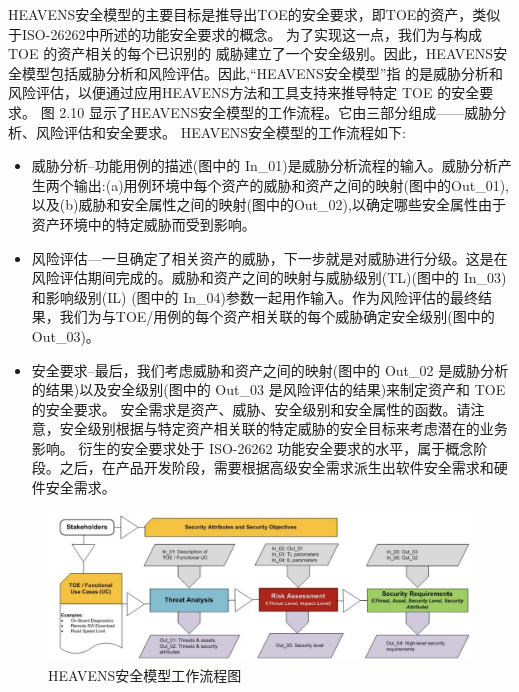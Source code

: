HEAVENS安全模型的主要目标是推导出TOE的安全要求，即TOE的资产，类似于ISO-26262中所述的功能安全要求的概念。
为了实现这一点，我们为与构成 TOE 的资产相关的每个已识别的
威胁建立了一个安全级别。因此，HEAVENS安全模型包括威胁分析和风险评估。因此,“HEAVENS安全模型”指
的是威胁分析和风险评估，以便通过应用HEAVENS方法和工具支持来推导特定 TOE 的安全要求。
图 2.10 显示了HEAVENS安全模型的工作流程。它由三部分组成——威胁分析、风险评估和安全要求。
HEAVENS安全模型的工作流程如下:
\begin{itemize}
    \item  威胁分析–功能用例的描述(图中的 In\_01)是威胁分析流程的输入。威胁分析产生两个输出:(a)用例环境中每个资产的威胁和资产之间的映射(图中的Out\_01),
    以及(b)威胁和安全属性之间的映射(图中的Out\_02),以确定哪些安全属性由于资产环境中的特定威胁而受到影响。
    \item  风险评估—一旦确定了相关资产的威胁，下一步就是对威胁进行分级。这是在风险评估期间完成的。威胁和资产之间的映射与威胁级别(TL)(图中的 In\_03)和影响级别(IL)
    (图中的 In\_04)参数一起用作输入。作为风险评估的最终结果，我们为与TOE/用例的每个资产相关联的每个威胁确定安全级别(图中的 Out\_03)。
    \item  安全要求–最后，我们考虑威胁和资产之间的映射(图中的 Out\_02 是威胁分析的结果)以及安全级别(图中的 Out\_03 是风险评估的结果)来制定资产和 TOE 的安全要求。
    安全需求是资产、威胁、安全级别和安全属性的函数。请注意，安全级别根据与特定资产相关联的特定威胁的安全目标来考虑潜在的业务影响。
    衍生的安全要求处于 ISO-26262 功能安全要求的水平，属于概念阶段。之后，在产品开发阶段，需要根据高级安全需求派生出软件安全需求和硬件安全需求。
  \end{itemize}


\begin{figure}
    \centering
    \includegraphics[scale=0.6]{resources/img/i11.png}
    \caption{HEAVENS安全模型工作流程图}
  \end{figure}


